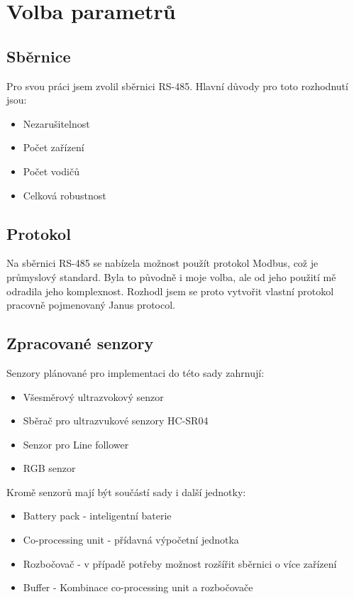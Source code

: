 \chapter{Volba parametrů}
\section{Sběrnice}
Pro svou práci jsem zvolil sběrnici RS-485.
Hlavní důvody pro toto rozhodnutí jsou:
\begin{itemize}
    \item Nezarušitelnost
    \item Počet zařízení
    \item Počet vodičů
    \item Celková robustnost
\end{itemize}

\section{Protokol}
Na sběrnici RS-485 se nabízela možnost použít protokol Modbus, což je průmyslový standard.
Byla to původně i moje volba, ale od jeho použití mě odradila jeho komplexnost.
Rozhodl jsem se proto vytvořit vlastní protokol pracovně pojmenovaný Janus protocol.

\section{Zpracované senzory}
Senzory plánované pro implementaci do této sady zahrnují:
\begin{itemize}
    \item Všesměrový ultrazvokový senzor
    \item Sběrač pro ultrazvukové senzory HC-SR04
    \item Senzor pro Line follower
    \item RGB senzor
    
\end{itemize}
Kromě senzorů mají být součástí sady i další jednotky:
\begin{itemize}
    \item Battery pack - inteligentní baterie
    \item Co-processing unit - přídavná výpočetní jednotka
    \item Rozbočovač - v případě potřeby možnost rozšířit sběrnici o více zařízení
    \item Buffer - Kombinace co-processing unit a rozbočovače
\end{itemize}
